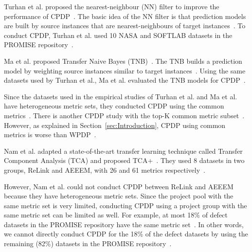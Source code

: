 Turhan et al. proposed the nearest-neighbour (NN) filter to improve the
performance of CPDP~\cite{Turhan09}. The basic idea of the NN
filter is that prediction models are built by source instances that are
nearest-neighbours of target instances~\cite{Turhan09}. To conduct
CPDP, Turhan et al. used 10 NASA and SOFTLAB datasets in the
PROMISE repository~\cite{promise12,Turhan09}.

Ma et al. proposed Transfer Naive Bayes (TNB)~\cite{Ma12}. The TNB builds a
prediction model by weighting source instances similar to target
instances~\cite{Ma12}. Using the same datasets used by Turhan et al., Ma et al.
evaluated the TNB models for CPDP~\cite{Ma12,Turhan09}.

Since the datasets used in the empirical studies of Turhan et al. and Ma et al.
have heterogeneous metric sets, they conducted CPDP using the common
metrics~\cite{Ma12,Turhan09}. There is another CPDP study with the top-K
common metric subset~\cite{He14subset}. However, as explained in
Section~\ref{sec:Introduction}, CPDP using common metrics is
worse than WPDP~\cite{He14subset,Turhan09}.



Nam et al. adapted a state-of-the-art
transfer learning technique called Transfer Component Analysis (TCA) and
proposed TCA+~\cite{Nam13}. They used 8
datasets in two groups, ReLink and AEEEM, with 26 and 61 metrics
respectively~\cite{Nam13}.
% 

However, Nam et al. could not conduct CPDP between ReLink and AEEEM because they
have heterogeneous metric sets.
Since the project pool with the same metric set is very limited, conducting
CPDP using a project group with the same metric set can be
limited as well. For example, at most 18\% of defect datasets in the
PROMISE repository have the same metric set~\cite{promise12}. In other words,
we cannot directly conduct CPDP for the 18\% of the defect datasets by
using the remaining (82\%) datasets in the PROMISE
repository~\cite{promise12}.



